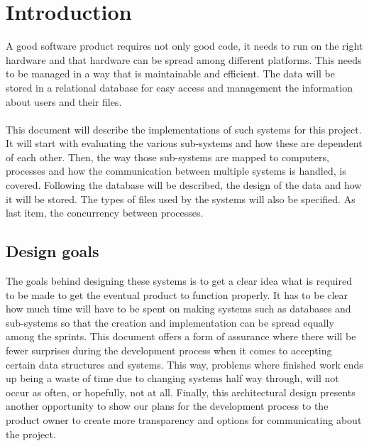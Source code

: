 \section{Introduction}
A good software product requires not only good code, it needs to run on the right hardware and that hardware can be spread among different platforms. This needs to be managed in a way that is maintainable and efficient. The data will be stored in a relational database for easy access and management the information about users and their files.
\paragraph{}
This document will describe the implementations of such systems for this project. It will start with evaluating the various sub-systems and how these are dependent of each other. Then, the way those sub-systems are mapped to computers, processes and how the communication between multiple systems is handled, is covered. 
Following the database will be described, the design of the data and how it will be stored. The types of files used by the systems will also be specified. 
As last item, the concurrency between processes.
\subsection{Design goals}
The goals behind designing these systems is to get a clear idea what is required to be made to get the eventual product to function properly. It has to be clear how much time will have to be spent on making systems such as databases and sub-systems so that the creation and implementation can be spread equally among the sprints. This document offers a form of assurance where there will be fewer surprises during the development process when it comes to accepting certain data structures and systems. This way, problems where finished work ends up being a waste of time due to changing systems half way through, will not occur as often, or hopefully, not at all.
Finally, this architectural design presents another opportunity to show our plans for the development process to the product owner to create more transparency and options for communicating about the project.


